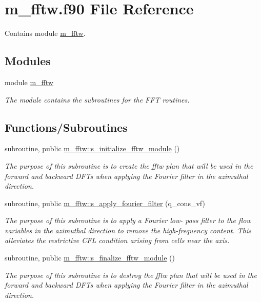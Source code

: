 \hypertarget{m__fftw_8f90}{}\section{m\+\_\+fftw.\+f90 File Reference}
\label{m__fftw_8f90}


Contains module \hyperlink{namespacem__fftw}{m\+\_\+fftw}.  


\subsection*{Modules}
\begin{DoxyCompactItemize}
\item 
module \hyperlink{namespacem__fftw}{m\+\_\+fftw}
\begin{DoxyCompactList}\small\item\em The module contains the subroutines for the F\+FT routines. \end{DoxyCompactList}\end{DoxyCompactItemize}
\subsection*{Functions/\+Subroutines}
\begin{DoxyCompactItemize}
\item 
subroutine, public \hyperlink{namespacem__fftw_a6f924722e9573d6526d5d1ba173f4ac6}{m\+\_\+fftw\+::s\+\_\+initialize\+\_\+fftw\+\_\+module} ()
\begin{DoxyCompactList}\small\item\em The purpose of this subroutine is to create the fftw plan that will be used in the forward and backward D\+F\+Ts when applying the Fourier filter in the azimuthal direction. \end{DoxyCompactList}\item 
subroutine, public \hyperlink{namespacem__fftw_ada93950a5527dfe2a35cc4f4ba77cb96}{m\+\_\+fftw\+::s\+\_\+apply\+\_\+fourier\+\_\+filter} (q\+\_\+cons\+\_\+vf)
\begin{DoxyCompactList}\small\item\em The purpose of this subroutine is to apply a Fourier low-\/ pass filter to the flow variables in the azimuthal direction to remove the high-\/frequency content. This alleviates the restrictive C\+FL condition arising from cells near the axis. \end{DoxyCompactList}\item 
subroutine, public \hyperlink{namespacem__fftw_a0666fa4d38fb46540fd108b76e835b45}{m\+\_\+fftw\+::s\+\_\+finalize\+\_\+fftw\+\_\+module} ()
\begin{DoxyCompactList}\small\item\em The purpose of this subroutine is to destroy the fftw plan that will be used in the forward and backward D\+F\+Ts when applying the Fourier filter in the azimuthal direction. \end{DoxyCompactList}\end{DoxyCompactItemize}
